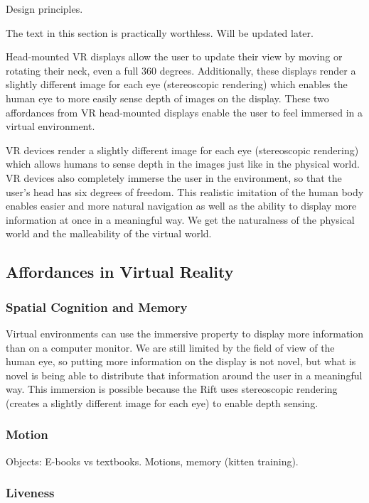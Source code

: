 \documentclass[conference]{IEEEtran}
\begin{document}
Design principles.

The text in this section is practically worthless. Will be updated later.

Head-mounted VR displays allow the user to update their view by moving or rotating their neck, even a full 360 degrees.
Additionally, these displays render a slightly different image for each eye (stereoscopic rendering) which enables the human eye to more easily sense depth of images on the display.
These two affordances from VR head-mounted displays enable the user to feel immersed in a virtual environment.

VR devices render a slightly different image for each eye (stereoscopic rendering) which allows humans to sense depth in the images just like in the physical world. 
VR devices also completely immerse the user in the environment, so that the user's head has six degrees of freedom. 
This realistic imitation of the human body enables easier and more natural navigation as well as the ability to display more information at once in a meaningful way. 
We get the naturalness of the physical world and the malleability of the virtual world.


\subsection{Affordances in Virtual Reality}

\subsubsection{Spatial Cognition and Memory}

Virtual environments can use the immersive property to display more information than on a computer monitor. 
We are still limited by the field of view of the human eye, so putting more information on the display is not novel, but what is novel is being able to distribute that information around the user in a meaningful way. 
This immersion is possible because the Rift uses stereoscopic rendering (creates a slightly different image for each eye) to enable depth sensing.

\subsubsection{Motion}

Objects: E-books vs textbooks.
Motions, memory (kitten training).

\subsubsection{Liveness}
\end{document}
